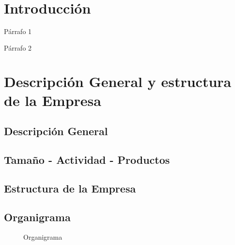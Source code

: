 \documentclass[12pt]{article}
\begin{document}


\tableofcontents
\listoftables
\listoffigures
\newpage

\section{Introducción}

Párrafo 1


Párrafo 2


\section{Descripción General y estructura de la Empresa}
\subsection{Descripción General}



\subsection{Tamaño - Actividad - Productos}



\subsection{Estructura de la Empresa}



\subsection{Organigrama}
\begin{figure}[H]

\caption{Organigrama}
\end{figure}
\end{document}
